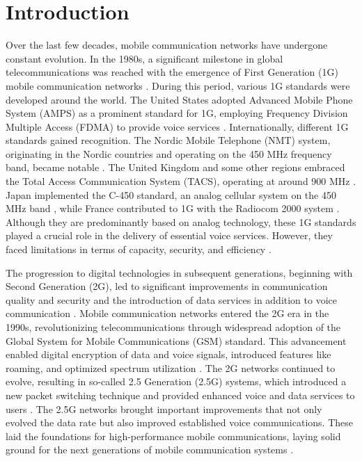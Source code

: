 \documentclass[conference]{IEEEtran}
\begin{document}
\section{Introduction}

Over the last few decades, mobile communication networks have undergone constant evolution. In the 1980s, a significant milestone in global telecommunications was reached with the emergence of First Generation (1G) mobile communication networks \cite{b1}. During this period, various 1G standards were developed around the world. The United States adopted Advanced Mobile Phone System (AMPS) as a prominent standard for 1G, employing Frequency Division Multiple Access (FDMA) to provide voice services \cite{b1, b2, b3, b4}. Internationally, different 1G standards gained recognition. The Nordic Mobile Telephone (NMT) system, originating in the Nordic countries and operating on the 450 MHz frequency band, became notable \cite{b5, b6}. The United Kingdom and some other regions embraced the Total Access Communication System (TACS), operating at around 900 MHz \cite{b7}. Japan implemented the C-450 standard, an analog cellular system on the 450 MHz band \cite{b8, b9}, while France contributed to 1G with the Radiocom 2000 system \cite{b8, b10}. Although they are predominantly based on analog technology, these 1G standards played a crucial role in the delivery of essential voice services. However, they faced limitations in terms of capacity, security, and efficiency \cite{b11, b12}.

The progression to digital technologies in subsequent generations, beginning with Second Generation (2G), led to significant improvements in communication quality and security and the introduction of data services in addition to voice communication \cite{b13}. Mobile communication networks entered the 2G era in the 1990s, revolutionizing telecommunications through widespread adoption of the Global System for Mobile Communications (GSM) standard. This advancement enabled digital encryption of data and voice signals, introduced features like roaming, and optimized spectrum utilization \cite{b14, b15, b16}. The 2G networks continued to evolve, resulting in so-called 2.5 Generation (2.5G) systems, which introduced a new packet switching technique and provided enhanced voice and data services to users \cite{b1}. The 2.5G networks brought important improvements that not only evolved the data rate but also improved established voice communications. These laid the foundations for high-performance mobile communications, laying solid ground for the next generations of mobile communication systems \cite{b17, b18}.
\end{document}
